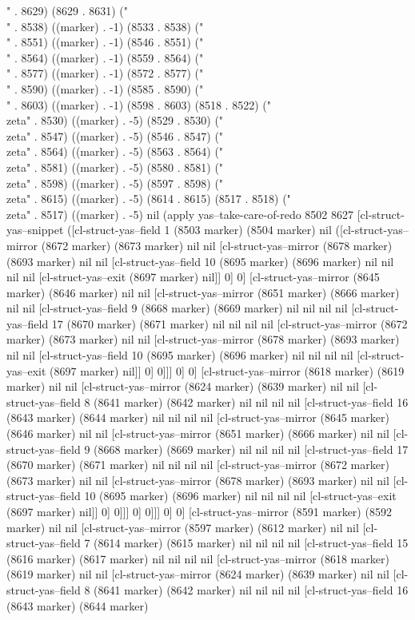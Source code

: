 {{" . 8629) (8629 . 8631) ("\\" . 8538) ((marker) . -1) (8533 . 8538) ("\\" . 8551) ((marker) . -1) (8546 . 8551) ("\\" . 8564) ((marker) . -1) (8559 . 8564) ("\\" . 8577) ((marker) . -1) (8572 . 8577) ("\\" . 8590) ((marker) . -1) (8585 . 8590) ("\\" . 8603) ((marker) . -1) (8598 . 8603) (8518 . 8522) ("\\zeta" . 8530) ((marker) . -5) (8529 . 8530) ("\\zeta" . 8547) ((marker) . -5) (8546 . 8547) ("\\zeta" . 8564) ((marker) . -5) (8563 . 8564) ("\\zeta" . 8581) ((marker) . -5) (8580 . 8581) ("\\zeta" . 8598) ((marker) . -5) (8597 . 8598) ("\\zeta" . 8615) ((marker) . -5) (8614 . 8615) (8517 . 8518) ("\\zeta" . 8517) ((marker) . -5) nil (apply yas--take-care-of-redo 8502 8627 [cl-struct-yas--snippet ([cl-struct-yas--field 1 (8503 marker) (8504 marker) nil ([cl-struct-yas--mirror (8672 marker) (8673 marker) nil nil [cl-struct-yas--mirror (8678 marker) (8693 marker) nil nil [cl-struct-yas--field 10 (8695 marker) (8696 marker) nil nil nil nil [cl-struct-yas--exit (8697 marker) nil]] 0] 0] [cl-struct-yas--mirror (8645 marker) (8646 marker) nil nil [cl-struct-yas--mirror (8651 marker) (8666 marker) nil nil [cl-struct-yas--field 9 (8668 marker) (8669 marker) nil nil nil nil [cl-struct-yas--field 17 (8670 marker) (8671 marker) nil nil nil nil [cl-struct-yas--mirror (8672 marker) (8673 marker) nil nil [cl-struct-yas--mirror (8678 marker) (8693 marker) nil nil [cl-struct-yas--field 10 (8695 marker) (8696 marker) nil nil nil nil [cl-struct-yas--exit (8697 marker) nil]] 0] 0]]] 0] 0] [cl-struct-yas--mirror (8618 marker) (8619 marker) nil nil [cl-struct-yas--mirror (8624 marker) (8639 marker) nil nil [cl-struct-yas--field 8 (8641 marker) (8642 marker) nil nil nil nil [cl-struct-yas--field 16 (8643 marker) (8644 marker) nil nil nil nil [cl-struct-yas--mirror (8645 marker) (8646 marker) nil nil [cl-struct-yas--mirror (8651 marker) (8666 marker) nil nil [cl-struct-yas--field 9 (8668 marker) (8669 marker) nil nil nil nil [cl-struct-yas--field 17 (8670 marker) (8671 marker) nil nil nil nil [cl-struct-yas--mirror (8672 marker) (8673 marker) nil nil [cl-struct-yas--mirror (8678 marker) (8693 marker) nil nil [cl-struct-yas--field 10 (8695 marker) (8696 marker) nil nil nil nil [cl-struct-yas--exit (8697 marker) nil]] 0] 0]]] 0] 0]]] 0] 0] [cl-struct-yas--mirror (8591 marker) (8592 marker) nil nil [cl-struct-yas--mirror (8597 marker) (8612 marker) nil nil [cl-struct-yas--field 7 (8614 marker) (8615 marker) nil nil nil nil [cl-struct-yas--field 15 (8616 marker) (8617 marker) nil nil nil nil [cl-struct-yas--mirror (8618 marker) (8619 marker) nil nil [cl-struct-yas--mirror (8624 marker) (8639 marker) nil nil [cl-struct-yas--field 8 (8641 marker) (8642 marker) nil nil nil nil [cl-struct-yas--field 16 (8643 marker) (8644 marker) }}
